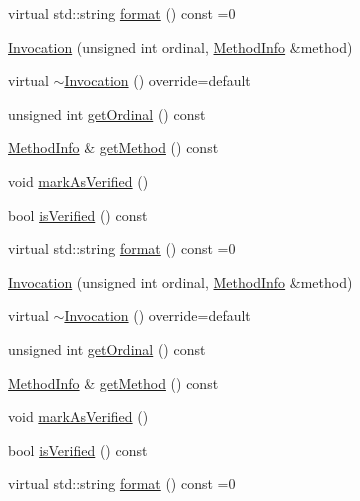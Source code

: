 \begin{DoxyCompactItemize}
\item 
virtual std\+::string \mbox{\hyperlink{structfakeit_1_1Invocation_ad6bf5d7b6ae2897c5d6bbb51183b8c1d}{format}} () const =0
\item 
\mbox{\hyperlink{structfakeit_1_1Invocation_a65e80c1f6eb1c04f7e6c48df5bd229a6}{Invocation}} (unsigned int ordinal, \mbox{\hyperlink{structfakeit_1_1MethodInfo}{Method\+Info}} \&method)
\item 
virtual \mbox{\hyperlink{structfakeit_1_1Invocation_a027b5d4605055387939c6e37cb01a427}{$\sim$\+Invocation}} () override=default
\item 
unsigned int \mbox{\hyperlink{structfakeit_1_1Invocation_a86b6f74924a9fed6b8760c2ba86a249b}{get\+Ordinal}} () const
\item 
\mbox{\hyperlink{structfakeit_1_1MethodInfo}{Method\+Info}} \& \mbox{\hyperlink{structfakeit_1_1Invocation_ae0b909794e14d6bba7db6baaef471865}{get\+Method}} () const
\item 
void \mbox{\hyperlink{structfakeit_1_1Invocation_a4579628568d7b469a1d225b3d43822e5}{mark\+As\+Verified}} ()
\item 
bool \mbox{\hyperlink{structfakeit_1_1Invocation_ae1c4e0840951bd5be209fd02196ecc59}{is\+Verified}} () const
\item 
virtual std\+::string \mbox{\hyperlink{structfakeit_1_1Invocation_ad6bf5d7b6ae2897c5d6bbb51183b8c1d}{format}} () const =0
\item 
\mbox{\hyperlink{structfakeit_1_1Invocation_a65e80c1f6eb1c04f7e6c48df5bd229a6}{Invocation}} (unsigned int ordinal, \mbox{\hyperlink{structfakeit_1_1MethodInfo}{Method\+Info}} \&method)
\item 
virtual \mbox{\hyperlink{structfakeit_1_1Invocation_a027b5d4605055387939c6e37cb01a427}{$\sim$\+Invocation}} () override=default
\item 
unsigned int \mbox{\hyperlink{structfakeit_1_1Invocation_a86b6f74924a9fed6b8760c2ba86a249b}{get\+Ordinal}} () const
\item 
\mbox{\hyperlink{structfakeit_1_1MethodInfo}{Method\+Info}} \& \mbox{\hyperlink{structfakeit_1_1Invocation_ae0b909794e14d6bba7db6baaef471865}{get\+Method}} () const
\item 
void \mbox{\hyperlink{structfakeit_1_1Invocation_a4579628568d7b469a1d225b3d43822e5}{mark\+As\+Verified}} ()
\item 
bool \mbox{\hyperlink{structfakeit_1_1Invocation_ae1c4e0840951bd5be209fd02196ecc59}{is\+Verified}} () const
\item 
virtual std\+::string \mbox{\hyperlink{structfakeit_1_1Invocation_ad6bf5d7b6ae2897c5d6bbb51183b8c1d}{format}} () const =0

\end{DoxyCompactItemize}
